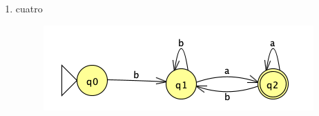 \documentclass[
	12pt, %
]{fphw}
\begin{document}
\begin{enumerate}
\begin{enumerate}[i]
\begin{figure}[H]
    \end{figure}
  \item cuatro\\
    \begin{figure}[H]
      \centering
      \includegraphics[width=\linewidth]{images/graph4.png}
    \end{figure}
  \end{enumerate}

\end{enumerate}
\end{document}
